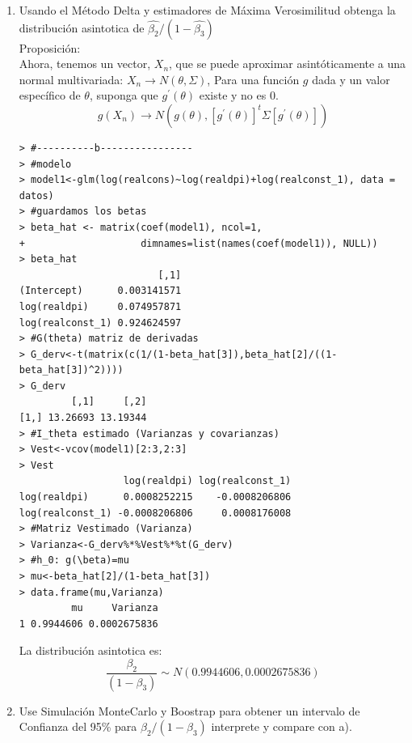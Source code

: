 \documentclass[12pt,a4paper]{report}
\begin{document}
\begin{enumerate}
\begin{enumerate}
Dado que el valor del p\_value es mayor a $\alpha =0.05$, no 
hay evidencia suficiente para rechazar $H_{0}$. Por lo que se concluye que $H_{0}: \beta_{2}/(1 -\beta_{3}) = 1$\\

\newpage

\item Usando el Método Delta y estimadores de Máxima Verosimilitud obtenga la distribución asintotica
de $\hat{\beta_{2}}/(1 -\hat{\beta_{3}})$\\

Proposición:\\
Ahora, tenemos un vector, $X_{n}$, que se puede aproximar asintóticamente a una normal multivariada:
$X_{n}\rightarrow N(\theta, \Sigma)$, Para una función $g$ dada y un valor específico de $\theta$, suponga que $g^{\prime}(\theta)$ existe y no es 0.\\
$$g(X_{n})\rightarrow N(g(\theta),[g^{\prime}(\theta)]^{t}\Sigma [g^{\prime}(\theta)])$$

\begin{verbatim}
> #----------b----------------
> #modelo
> model1<-glm(log(realcons)~log(realdpi)+log(realconst_1), data = datos)
> #guardamos los betas
> beta_hat <- matrix(coef(model1), ncol=1,
+                    dimnames=list(names(coef(model1)), NULL))
> beta_hat
                        [,1]
(Intercept)      0.003141571
log(realdpi)     0.074957871
log(realconst_1) 0.924624597
> #G(theta) matriz de derivadas
> G_derv<-t(matrix(c(1/(1-beta_hat[3]),beta_hat[2]/((1-beta_hat[3])^2))))
> G_derv
         [,1]     [,2]
[1,] 13.26693 13.19344
> #I_theta estimado (Varianzas y covarianzas)
> Vest<-vcov(model1)[2:3,2:3]
> Vest
                  log(realdpi) log(realconst_1)
log(realdpi)      0.0008252215    -0.0008206806
log(realconst_1) -0.0008206806     0.0008176008
> #Matriz Vestimado (Varianza)
> Varianza<-G_derv%*%Vest%*%t(G_derv)
> #h_0: g(\beta)=mu
> mu<-beta_hat[2]/(1-beta_hat[3])
> data.frame(mu,Varianza)
         mu     Varianza
1 0.9944606 0.0002675836
\end{verbatim}

La distribución asintotica es:\\
$$\dfrac{\beta_{2}}{(1 -\beta_{3})}\sim N(0.9944606, 0.0002675836)$$


\item Use Simulación MonteCarlo y Boostrap para obtener un intervalo de Confianza del 95\% para $\beta_{2}/(1 -\beta_{3})$ interprete y compare con a).
\end{enumerate}
\end{enumerate}
\end{document}
